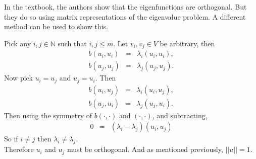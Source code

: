 \documentclass[../../main.tex]{subfiles}
\begin{document}
In the textbook, the authors show that the eigenfunctions are orthogonal. But they do so using matrix representations of the eigenvalue problem. A different method can be used to show this.

Pick any $i,j \in \mathbb{N}$ such that $i,j \leq m$. Let $v_{i},v_{j} \in V$ be arbitrary, then
\begin{eqnarray*}
	b(u_{i},u_{i}) &=& \lambda_{i}( u_{i},u_{i}),\\
	b(u_{j},u_{j}) &=& \lambda_{j}( u_{j},u_{j}).
\end{eqnarray*}
Now pick $u_{i} = u_{j}$ and $u_{j} = u_{i}$. Then
\begin{eqnarray*}
	b(u_{i},u_{j}) &=& \lambda_{i}( u_{i},u_{j}),\\
	b(u_{j},u_{i}) &=& \lambda_{j}( u_{j},u_{i}).
\end{eqnarray*}
Then using the symmetry of $b(\cdot,\cdot)$ and $( \cdot, \cdot )$, and subtracting,
\begin{eqnarray*}
	0 &=& (\lambda_{i} - \lambda_{j})( u_{i}, u_{j} )
\end{eqnarray*}
So if $i \neq j$ then $\lambda_{i} \neq \lambda_{j}$.\\

Therefore $u_{i}$ and $u_{j}$ must be orthogonal. And as mentioned previously, $||u|| = 1$.
\end{document}
